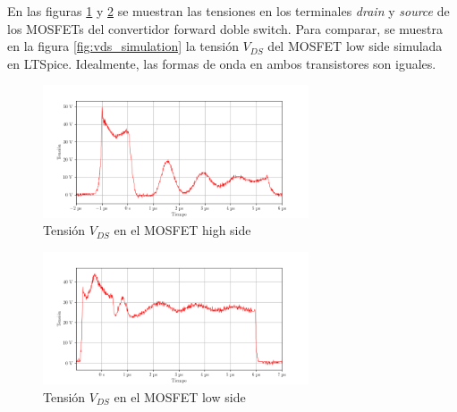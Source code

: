


En las figuras \ref{fig:vds_high} y \ref{fig:vds_low} se muestran las tensiones en los terminales \textit{drain} y \textit{source} de los MOSFETs del convertidor forward doble switch.
Para comparar, se muestra en la figura \ref{fig:vds_simulation} la tensión $V_{DS}$ del MOSFET low side simulada en LTSpice. Idealmente, las formas de onda en ambos transistores son iguales.

\begin{figure}[H]
    \centering
    \includegraphics[width=0.7\textwidth]{images/capturas-osciloscopio/MOSFET/vds-high.png}
    \caption{Tensión $V_{DS}$ en el MOSFET high side}
    \label{fig:vds_high}
\end{figure}

\begin{figure}[H]
    \centering
    \includegraphics[width=0.7\textwidth]{images/capturas-osciloscopio/MOSFET/vds-low.png}
    \caption{Tensión $V_{DS}$ en el MOSFET low side}
    \label{fig:vds_low}
\end{figure}










